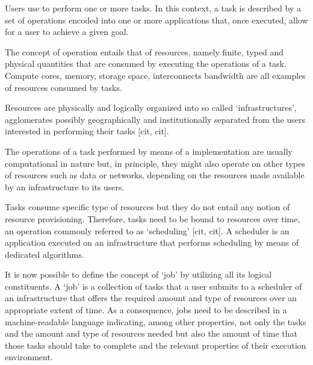 \documentclass{sig-alternate}
\begin{document}

Users use \pilotjobs to perform one or more tasks. In this context, a task is described by a set of operations encoded into one or more applications that, once executed, allow for a user to achieve a given goal.


The concept of operation entails that of resources, namely finite, typed and physical quantities that are consumed by executing the operations of a task. Compute cores, memory, storage space,  interconnects bandwidth are all examples of resources consumed by tasks. 


Resources are physically and logically organized into so called `infrastructures', agglomerates possibly geographically and institutionally separated from the users interested in performing their tasks [cit, cit].


The operations of a task performed by means of a \pilotjob implementation are usually computational in nature but, in principle, they might also operate on other types of resources such as data or networks, depending on the resources made available by an infrastructure to its users.


Tasks consume specific type of resources but they do not entail any
notion of resource provisioning. Therefore, tasks need to be bound to
resources over time, an operation commonly referred to as `scheduling'
[cit, cit]. A scheduler is an application executed on an infrastructure
that performs scheduling by means of dedicated algorithms.


It is now possible to define the concept of `job' by utilizing all its logical constituents. A `job' is a collection of tasks that a user submits to a scheduler of an infrastructure that offers the required amount and type of resources over an appropriate extent of time. As a consequence, jobs need to be described in a machine-readable language indicating, among other properties, not only the tasks and the amount and type of resources needed but also the amount of time that those tasks should take to complete and the relevant properties of their execution environment.
\end{document}
